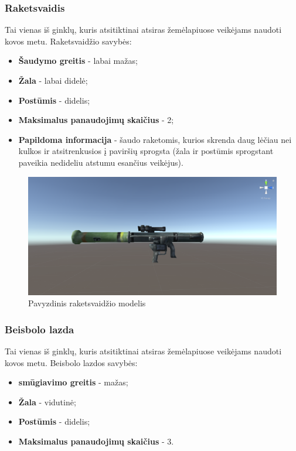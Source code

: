 \documentclass{VUMIFPSkursinis}
\begin{document}
\subsubsection{Raketsvaidis}
Tai vienas iš ginklų, kuris atsitiktinai atsiras žemėlapiuose veikėjams naudoti kovos metu. Raketsvaidžio savybės:
\begin{itemize}
    \item \textbf{Šaudymo greitis} - labai mažas;
    \item \textbf{Žala} - labai didelė;
    \item \textbf{Postūmis} - didelis;
    \item \textbf{Maksimalus panaudojimų skaičius} - 2;
    \item \textbf{Papildoma informacija} - šaudo raketomis, kurios skrenda daug lėčiau nei kulkos ir atsitrenkusios į paviršių sprogsta (žala ir postūmis sprogstant paveikia nedideliu atstumu esančius veikėjus).
\end{itemize}

\begin{figure}[H]
    \centering
    \includegraphics[scale=0.3]{img/Weapons/Rocket_launcher.png}
    \caption{Pavyzdinis raketsvaidžio modelis}
    \label{img:rocketlauncher}
\end{figure}

\subsubsection{Beisbolo lazda}
Tai vienas iš ginklų, kuris atsitiktinai atsiras žemėlapiuose veikėjams naudoti kovos metu. Beisbolo lazdos savybės:
\begin{itemize}
    \item \textbf{smūgiavimo greitis} - mažas;
    \item \textbf{Žala} - vidutinė;
    \item \textbf{Postūmis} - didelis;
    \item \textbf{Maksimalus panaudojimų skaičius} - 3.
\end{itemize}
\end{document}
